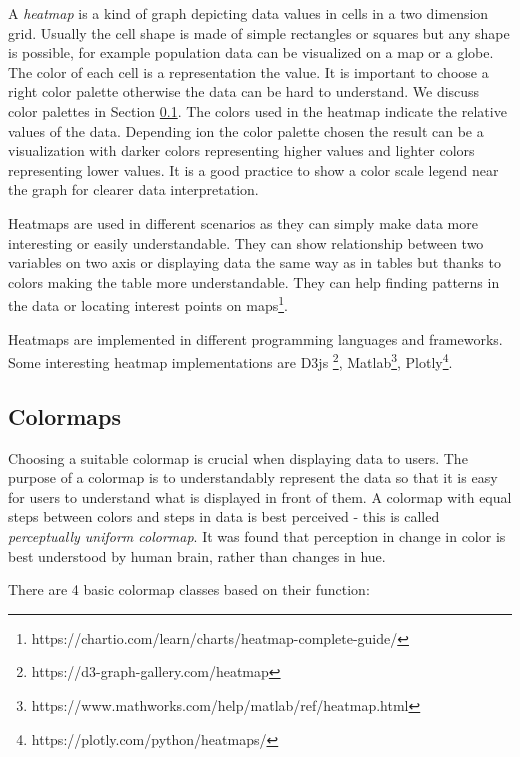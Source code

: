 A \textit{heatmap} is a kind of graph depicting data values in cells in a two dimension grid. Usually the cell shape is made of simple rectangles or squares but any shape is possible, for example population data can be visualized on a map or a globe. The color of each cell is a representation the value. It is important to choose a right color palette otherwise the data can be hard to understand. We discuss color palettes in Section \ref{txt.design.frontend.colormap}. The colors used in the heatmap indicate the relative values of the data. Depending ion the color palette chosen the result can be a visualization with darker colors representing higher values and lighter colors representing lower values. It is a good practice to show a color scale legend near the graph for clearer data interpretation.

Heatmaps are used in different scenarios as they can simply make data more interesting or easily understandable. They can show relationship between two variables on two axis or displaying data the same way as in tables but thanks to colors making the table more understandable. They can help finding patterns in the data or locating interest points on maps\footnote{https://chartio.com/learn/charts/heatmap-complete-guide/}.

Heatmaps are implemented in different programming languages and frameworks. Some interesting heatmap implementations are D3js \footnote{https://d3-graph-gallery.com/heatmap}, Matlab\footnote{https://www.mathworks.com/help/matlab/ref/heatmap.html}, Plotly\footnote{https://plotly.com/python/heatmaps/}.



\subsection{Colormaps}\label{txt.design.frontend.colormap}

Choosing a suitable colormap is crucial when displaying data to users. The purpose of a colormap is to understandably represent the data so that it is easy for users to understand what is displayed in front of them.  A colormap with equal steps between colors and steps in data is best perceived - this is called \textit{perceptually uniform colormap}. It was found that perception in change in color is best understood by human brain, rather than changes in hue. 

There are 4 basic colormap classes based on their function:

